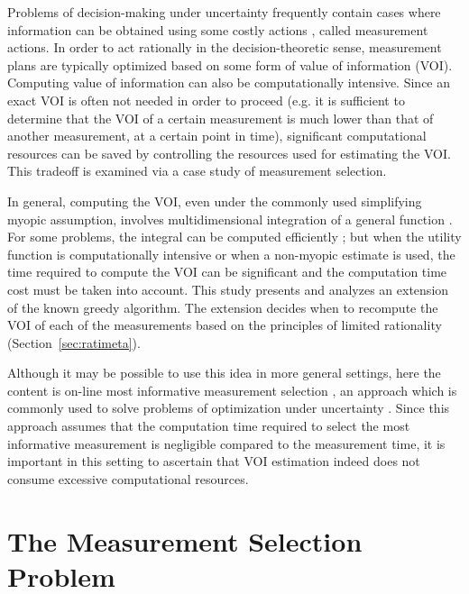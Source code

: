 Problems of decision-making under uncertainty frequently contain cases
where information can be obtained using some costly actions \cite{WicklerPotter.information-gathering}, called
measurement actions. In order to act rationally in the
decision-theoretic sense, measurement plans are typically optimized
based on some form of value of information (VOI). Computing value of
information can also be computationally intensive. Since an exact
VOI is often not needed in
order to proceed (e.g. it is sufficient to determine that the VOI
of a certain measurement is much lower than that of
another measurement, at a certain point in time), significant
computational resources can be saved by controlling the resources used
for estimating the VOI. This tradeoff is examined via a case
study of measurement selection. 

In general, computing the VOI, even under the commonly used
simplifying myopic assumption, involves multidimensional integration
of a general function \cite{Russell.right}. For some problems, the
integral can be computed efficiently \cite{Russell.gametree}; but when
the utility function is computationally intensive or when a non-myopic
estimate is used, the time required to compute the VOI can be
significant \cite{Heckerman.nonmyopic} \cite{BilgicGetoor.voila} and
the computation time cost must be taken into account.  This study
presents and analyzes an extension of the known greedy algorithm. The
extension decides when to recompute the VOI of each of the
measurements based on the principles of limited rationality (Section~\ref{sec:ratimeta}).

Although it may be possible to use this idea in more general settings,
here the content is on-line most informative measurement selection
\cite{Guestrin.submodular} \cite{BilgicGetoor.voila}, an approach
which is commonly used to solve problems of optimization under
uncertainty \cite{Rish.efficient} \cite{Krause.water}. Since this
approach assumes that the computation time required to select the most
informative measurement is negligible compared to the measurement
time, it is important in this setting to ascertain that VOI estimation
indeed does not consume excessive computational resources.

\section{The Measurement Selection Problem}
\label{sec:raticomp-greedy}

